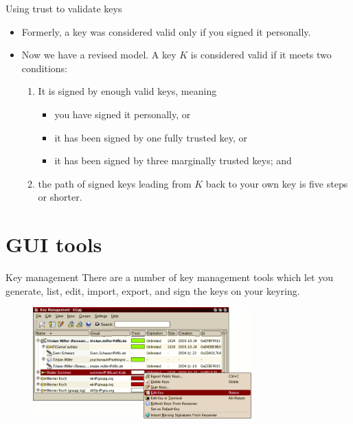 \documentclass[%
mode=present,%
paper=screen%
]{powerdot}
\begin{document}
\begin{slide}{Using trust to validate keys}
  \begin{itemize}
  \item Formerly, a key was considered valid only if you signed it
    personally.
  \item Now we have a revised model.  A key $K$ is considered valid if
    it meets two conditions:
    \begin{enumerate}
    \item It is signed by enough valid keys, meaning
      \begin{itemize}
      \item you have signed it personally, or
      \item it has been signed by one fully trusted key, or
      \item it has been signed by three marginally trusted keys; and
      \end{itemize}
    \item the path of signed keys leading from $K$ back to your own
      key is five steps or shorter.
    \end{enumerate}
  \end{itemize}
\end{slide}

\section{GUI tools}

\begin{slide}{Key management}
  There are a number of key management tools which let you generate,
  list, edit, import, export, and sign the keys on your keyring.
  \begin{figure}[H]
    \centering
    \includegraphics[width=0.75\textwidth]{kgpg1}
    \label{fig:kgpg1}
  \end{figure}
\end{slide}
\end{document}
